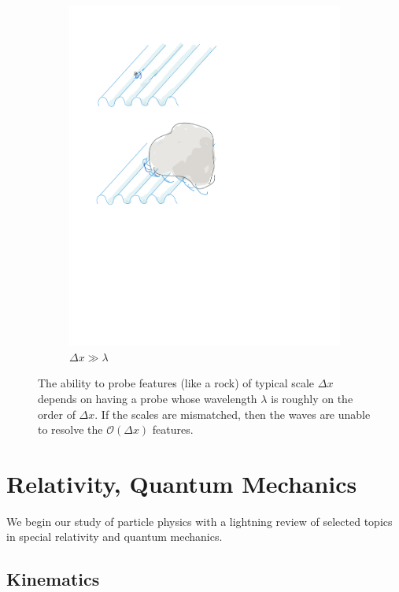 \documentclass[12pt, oneside]{report}    %
\let\oldsection\section
\def\section{%
  \setcounter{sidenote}{1}%
  \oldsection
}
\begin{document}
\begin{figure}
\begin{subfigure}{0.3\textwidth}
        \includegraphics[width=\linewidth]{figures/waves_big.pdf}
        \caption{$\Delta x \gg \lambda$}
        \label{fig:subfig:waves:big}
    \end{subfigure}%
    \caption{The ability to probe features (like a rock) of typical scale $\Delta x$ depends on having a probe whose wavelength $\lambda$ is roughly on the order of $\Delta x$. If the scales are mismatched, then the waves are unable to resolve the $\mathcal O(\Delta x)$ features.}
    \label{fig:subfig:waves}
\end{figure}



\chapter{Relativity, Quantum Mechanics}

We begin our study of particle physics with a lightning review of selected topics in special relativity and quantum mechanics.

\section{Kinematics}
\end{document}
